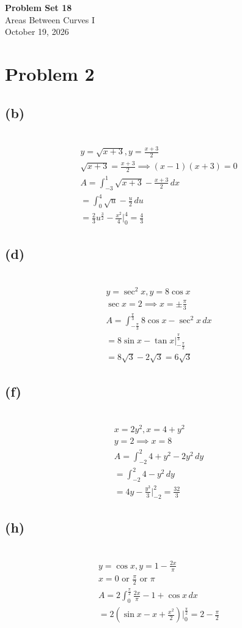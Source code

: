 \documentclass[12pt]{article}
\newcommand{\tor}{\text{ or }}
\newcommand{\problem}[1]{\section{Problem #1}}
\newcommand{\subproblem}[1]{\subsection{(#1)} \,}
\begin{document}
\vspace*{0cm}

\begin{center}
    {\Large \bfseries Problem Set 18} \\[0.5cm]
    {\large Areas Between Curves I} \\[0.35cm]
    {\normalsize October 19, 2026}
\end{center}


\problem{2}

\subproblem{b}
\begin{gather*}
    y=\sqrt{x+3} ,y=\frac{x+3}{2}\\
    \sqrt{x+3} = \frac{x+3}{2} \implies (x-1)(x+3)=0\\
    A=\int_{-3}^1 \sqrt{x+3} - \frac{x+3}{2}\, dx\\
    = \int_0^4 \sqrt{u} - \frac{u}{2}\, du\\
    = \frac{2}{3}u^\frac{3}{2} - \frac{x^2}{4} \Big|^4_0 = \boxed{\frac{4}{3}}
\end{gather*}

\subproblem{d}
\begin{gather*}
    y=\sec^2 x , y=8\cos x\\
    \sec x =2\implies x=\pm \frac{\pi}{3}\\
    A= \int_{-\frac{\pi}{3}}^\frac{\pi}{3} 8\cos x-\sec ^2 x\, dx\\
    = 8\sin x -\tan x \Big|_{-\frac{\pi}{3}}^\frac{\pi}{3} \\
    = 8\sqrt{3} - 2\sqrt{3} = \boxed{6\sqrt{3}}
\end{gather*}

\subproblem{f}
\begin{gather*}
    x=2y^2,x=4+y^2\\
    y=2 \implies x=8\\
    A=\int_{-2}^{2} 4+y^2-2y^2\, dy\\
     = \int_{-2}^{2}  4-y^2\, dy\\
     = 4y-\frac{y^3}{3} \Big|_{-2}^{2} = \boxed{\frac{32}{3}}
\end{gather*}

\subproblem{h}
\begin{gather*}
    y=\cos x,y=1-\frac{2x}{\pi}\\
    x=0 \tor \frac{\pi}{2} \tor \pi \\
    A=2\int_0^\frac{\pi}{2} \frac{2x}{\pi}-1+ \cos x\, dx\\
    = 2(\sin x -x +\frac{x^2}{2})\Big|^\frac{\pi}{2}_0 = \boxed{2-\frac{\pi}{2}}
\end{gather*}
\end{document}
